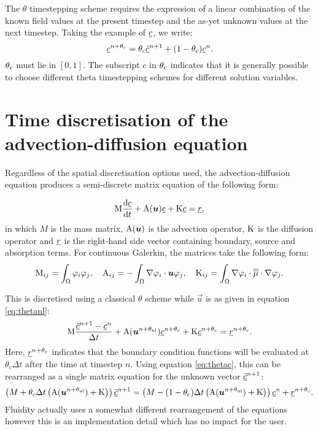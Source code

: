 The $\theta$ timestepping scheme requires the expression of a linear
combination of the known field values at the present timestep and the as-yet
unknown values at the next timestep. Taking the example of $\underline{c}$, we write:
\begin{equation}
  \label{eq:thetac}
  \underline{c}^{n+\theta_c}=\theta_c\underline{\tilde c}^{n+1}+(1-\theta_c)\underline{c}^{n}.
\end{equation}
$\theta_c$ must lie in $[0,1]$. The subscript $c$ in $\theta_c$ indicates that it is 
generally possible to choose different theta timestepping schemes for different solution
variables.

\section{Time discretisation of the advection-diffusion equation}
\label{sect:ND_time_disct_adv_diff}

Regardless of the spatial discretisation options used, the
advection-diffusion equation produces a semi-discrete matrix equation of the
following form:

\begin{equation}
  \mathrm{M} \frac{\mathrm{d}\underline{c}}{\mathrm{d} t}+\mathrm{A}({\mbox{\boldmath$u$}})\underline{c}+\mathrm{K}\underline{c}=\underline{r},
\end{equation}
in which $M$ is the mass matrix, $\mathrm{A}({\mbox{\boldmath$u$}})$ is the advection
operator, $\mathrm{K}$ is the diffusion operator and $\underline{r}$ is the
right-hand side vector containing boundary, source and absorption terms. For continuous
Galerkin, the matrices take the following form:
\begin{equation}
  \mathrm{M}_{ij}=\int_\Omega \varphi_i\varphi_j, \quad
  \mathrm{A}_{ij}=-\int_\Omega \nabla\varphi_i\cdot{\mbox{\boldmath$u$}} \varphi_j, \quad
  \mathrm{K}_{ij}=\int_\Omega \nabla\varphi_i\cdot \overline{\overline{\mu}}\cdot\nabla \varphi_j.
\end{equation}

This is discretised using a classical $\theta$ scheme while $\vec u$ is as
given in equation \eqref{eq:thetanl}:
\begin{equation}
  \mathrm{M} \frac{\underline{\tilde c}^{n+1}-\underline{c}^{n}}{\Delta t}
  +\mathrm{A}({\mbox{\boldmath$u$}}^{n+\theta_{\mathrm{nl}}})\underline{c}^{n+\theta_c}+\mathrm{K}\underline{c}^{n+\theta_c}=\underline{r}^{n+\theta_c}.
\end{equation}
Here, $\underline{r}^{n+\theta_c}$ indicates that the boundary condition
functions will be evaluated at $\theta_c\Delta t$ after the time at timestep
$n$. Using equation \eqref{eq:thetac}, this can be rearranged as a single
matrix equation for the unknown vector $\underline{\tilde c}^{n+1}$:
\begin{equation}
  \left(M+\theta_c\Delta t\left(\mathrm{A}({\mbox{\boldmath$u$}}^{n+\theta_{\mathrm{nl}}})+\mathrm{K}\right)\right)\underline{\tilde c}^{n+1}
  =\left(M-(1-\theta_c)\Delta
    t\left(\mathrm{A}({\mbox{\boldmath$u$}}^{n+\theta_{\mathrm{nl}}})+\mathrm{K}\right)\right)\underline{c}^{n} +\underline{r}^{n+\theta_c}.
\end{equation}
Fluidity actually uses a somewhat different rearrangement of the equations
however this is an implementation detail which has no impact for the user.

